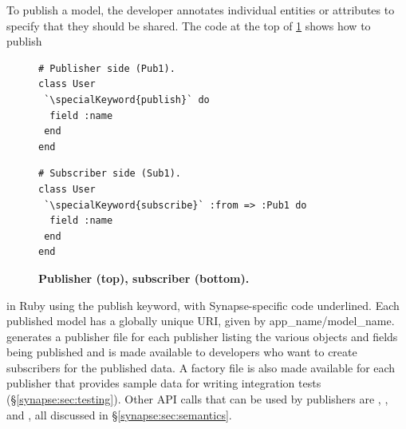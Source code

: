 To publish a model, the developer annotates individual entities or attributes
to specify that they should be shared. The code at the top of
\F\ref{synapse:fig:pub-sub} shows how to publish
\begin{figure}
\vspace{-0.2cm}
\begin{minipage}{.18\textwidth}
\begin{lstlisting}[xleftmargin=2pt,framexleftmargin=2pt]
# Publisher side (Pub1).
class User
 `\specialKeyword{publish}` do
  field :name
 end
end
\end{lstlisting}\vspace{-12pt}
\begin{lstlisting}[xleftmargin=2pt,framexleftmargin=2pt]
# Subscriber side (Sub1).
class User
 `\specialKeyword{subscribe}` :from => :Pub1 do
  field :name
 end
end
\end{lstlisting}
\end{minipage}
\vspace{-0.5cm}
\caption{{\footnotesize {\bf Publisher (top), subscriber (bottom).}}}
\vspace{-5pt}
\label{synapse:fig:pub-sub}
\end{figure}
in Ruby using the {\code publish} keyword, with Synapse-specific code
underlined.  Each published model has a globally unique URI, given by {\code
app\_name/model\_name}.  \synapse generates a publisher file for each
publisher listing the various objects and fields being published and is made
available to developers who want to create subscribers for the published data.
A factory file is also made available for each publisher that provides sample
data for writing integration tests (\S\ref{synapse:sec:testing}).  Other API calls that
can be used by publishers are {}, {}, and {}, all discussed in
\S\ref{synapse:sec:semantics}.

